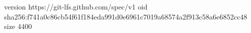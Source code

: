 version https://git-lfs.github.com/spec/v1
oid sha256:f741a0c86cb54f61f184eda991d0e6961c7019a68574a2f913c58a6e6852cc48
size 4400
